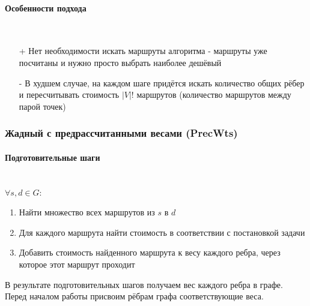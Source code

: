 \documentclass[a4paper]{article}
\begin{document}
\paragraph{Особенности подхода}\mbox{}\\
\begin{itemize}
\item[+] Нет необходимости искать маршруты алгоритма - маршруты уже посчитаны и нужно просто выбрать наиболее дешёвый
\item[-] В худшем случае, на каждом шаге придётся искать количество общих рёбер и пересчитывать стоимость $|V|!$ маршрутов (количество маршрутов между парой точек)
\end{itemize}

\subsubsection{Жадный с предрассчитанными весами (PrecWts)} \label{pre_wts}
\paragraph{Подготовительные шаги}\mbox{}\\
$\forall s, d \in G: $
\begin{enumerate}
\item Найти множество всех маршрутов из $s$ в $d$
\item Для каждого маршрута найти стоимость в соответствии с постановкой задачи
\item Добавить стоимость найденного маршрута к весу каждого ребра, через которое этот маршрут проходит
\end{enumerate}
В результате подготовительных шагов получаем вес каждого ребра в графе. Перед началом работы присвоим рёбрам графа соответствующие веса.
\end{document}
